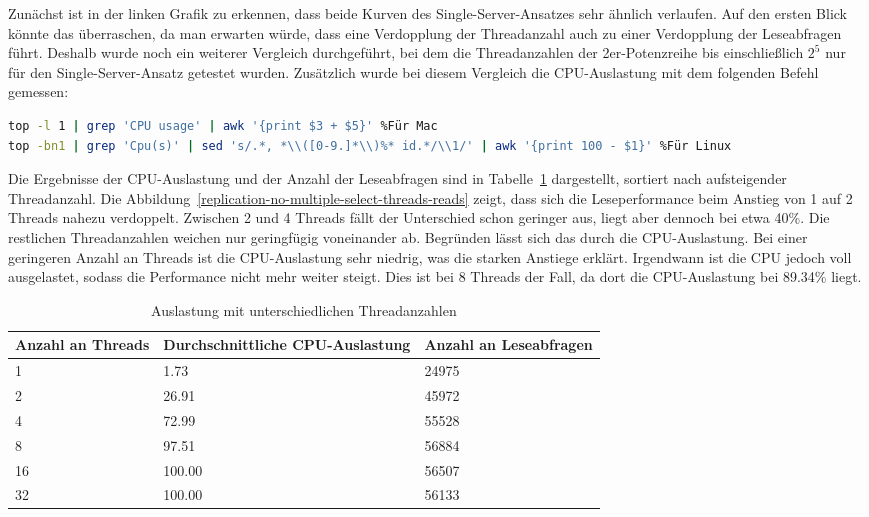 Zunächst ist in der linken Grafik zu erkennen, dass beide Kurven des Single-Server-Ansatzes sehr ähnlich verlaufen.
Auf den ersten Blick könnte das überraschen, da man erwarten würde, dass eine Verdopplung der Threadanzahl auch zu einer Verdopplung der Leseabfragen führt.
Deshalb wurde noch ein weiterer Vergleich durchgeführt, bei dem die Threadanzahlen der 2er-Potenzreihe bis einschließlich $2^5$ nur für den Single-Server-Ansatz getestet wurden.
Zusätzlich wurde bei diesem Vergleich die CPU-Auslastung mit dem folgenden Befehl gemessen:

\vspace{-5pt}
\begin{lstlisting}[language=bash,caption=Messen der CPU-Auslastung,label={lst:replication-cpu-usage},style=custom_daniel,basicstyle=\ttfamily\scriptsize]
top -l 1 | grep 'CPU usage' | awk '{print $3 + $5}' %Für Mac
top -bn1 | grep 'Cpu(s)' | sed 's/.*, *\\([0-9.]*\\)%* id.*/\\1/' | awk '{print 100 - $1}' %Für Linux
\end{lstlisting}
\vspace{-5pt}

Die Ergebnisse der CPU-Auslastung und der Anzahl der Leseabfragen sind in Tabelle~\ref{tab:replication-multiple-select-threads} dargestellt, sortiert nach aufsteigender Threadanzahl.
Die Abbildung~\ref{replication-no-multiple-select-threads-reads} zeigt, dass sich die Leseperformance beim Anstieg von 1 auf 2 Threads nahezu verdoppelt.
Zwischen 2 und 4 Threads fällt der Unterschied schon geringer aus, liegt aber dennoch bei etwa 40\%.
Die restlichen Threadanzahlen weichen nur geringfügig voneinander ab.
Begründen lässt sich das durch die CPU-Auslastung.
Bei einer geringeren Anzahl an Threads ist die CPU-Auslastung sehr niedrig, was die starken Anstiege erklärt.
Irgendwann ist die CPU jedoch voll ausgelastet, sodass die Performance nicht mehr weiter steigt.
Dies ist bei 8 Threads der Fall, da dort die CPU-Auslastung bei 89.34\% liegt.

\vspace{-2pt}
\begin{table}[H]
  \centering
  \scriptsize
  \begin{tabular}{|l|l|l|}
    \hline
    \textbf{Anzahl an Threads} & \textbf{Durchschnittliche CPU-Auslastung} & \textbf{Anzahl an Leseabfragen} \\
    \hline
    1 & 1.73 & 24975 \\
    2 & 26.91 & 45972 \\
    4 & 72.99 & 55528 \\
    8 & 97.51 & 56884 \\
    16 & 100.00 & 56507 \\
    32 & 100.00 & 56133 \\
    \hline
  \end{tabular}
  \vspace{3pt}
  \caption{Auslastung mit unterschiedlichen Threadanzahlen}
  \label{tab:replication-multiple-select-threads}
\end{table}
\vspace{-25pt}

